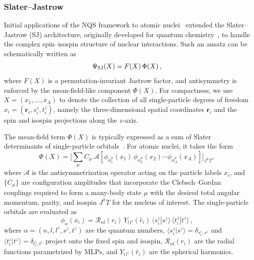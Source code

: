 \subsubsection{Slater--Jastrow}
\label{subsub:slater_jastrow}
Initial applications of the NQS framework to atomic nuclei~\cite{adams_variational_2021}
extended the Slater--Jastrow (SJ) architecture, originally developed for quantum
chemistry~\cite{hermann_deep-neural-network_2020,pfau_ab_2020}, to handle the
complex spin--isospin structure of nuclear interactions. Such an ansatz can be
schematically written as
\begin{equation}
\Psi_{\rm SJ}(X) = F(X)\,\Phi(X)\,,
\label{eq:SJ}
\end{equation}
where $F(X)$ is a permutation-invariant Jastrow factor, and antisymmetry is
enforced by the mean-field-like component $\Phi(X)$. 
For compactness, we use $X=(x_1, \ldots, x_A)$ to denote the collection of all single-particle degrees of freedom $x_i = (\mathbf{r}_i, s_i^z, t_i^z)$, namely the three-dimensional spatial coordinates $\mathbf{r}_i$ and the spin and isospin projections along the $z$-axis.

The mean-field term $\Phi(X)$ is typically expressed as a sum of Slater determinants of single-particle orbitals~\cite{adams_variational_2021,gnech_calculation_2020,yang_consistent_2022}. For atomic nuclei, it takes the form
\begin{equation}
\Phi(X)
= \Bigg[\sum_\mu C_\mu \,
\mathcal{A}\!\left[\phi_{\alpha_1^\mu}(x_1)\,\phi_{\alpha_2^\mu}(x_2)\cdots 
\phi_{\alpha_A^\mu}(x_A)\right]\Bigg]_{J^\pi T}\!,
\label{eq:mf}
\end{equation}
where $\mathcal{A}$ is the antisymmetrization operator acting on the particle labels $x_i$, and $\{C_\mu\}$ are configuration amplitudes that incorporate the Clebsch--Gordan couplings required to form a many-body state $\mu$ with the desired total angular momentum, parity, and isospin $J^\pi T$ for the nucleus of interest. The single-particle orbitals are evaluated as
\begin{equation}
\phi_{\alpha}(x_i) 
= \mathcal{R}_{n l}(r_i)\, Y_{l\,l^z}(\hat{r}_i)\,
\langle s_i^z | s^z \rangle \,
\langle t_i^z | t^z \rangle \, ,
\label{eq:single_particle_nuclei}
\end{equation}
where $\alpha = (n, l, l^z, s^z, t^z)$ are the quantum numbers, 
$\langle s_i^z | s^z \rangle = \delta_{s_i^z,s^z}$ and 
$\langle t_i^z | t^z \rangle = \delta_{t_i^z,t^z}$ project onto the fixed spin and isospin, $\mathcal{R}_{nl}(r_i)$ are the 
radial functions parametrized by MLPs, and $Y_{l\,l^z}(\hat{r}_i)$ are the spherical harmonics. 




